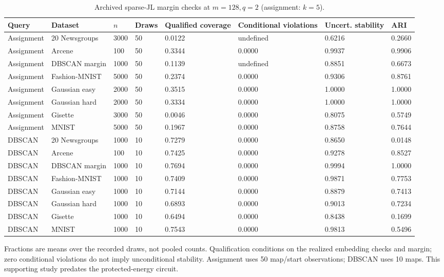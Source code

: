 \begin{table}[!htbp]
\caption{Archived sparse-JL margin checks at $m=128,q=2$ (assignment: $k=5$).}\label{tab:cert-a}
\centering\scriptsize
\begin{adjustbox}{max width=\textwidth}
\begin{tabular}{@{}llllllll@{}}
\toprule
Query & Dataset & $n$ & Draws & Qualified coverage & Conditional violations & Uncert. stability & ARI \\
\midrule
Assignment & 20 Newsgroups & 3000 & 50 & 0.0122 & undefined & 0.6216 & 0.2660 \\
Assignment & Arcene & 100 & 50 & 0.3344 & 0.0000 & 0.9937 & 0.9906 \\
Assignment & DBSCAN margin & 1000 & 50 & 0.1139 & undefined & 0.8851 & 0.6673 \\
Assignment & Fashion-MNIST & 5000 & 50 & 0.2374 & 0.0000 & 0.9306 & 0.8761 \\
Assignment & Gaussian easy & 2000 & 50 & 0.3515 & 0.0000 & 1.0000 & 1.0000 \\
Assignment & Gaussian hard & 2000 & 50 & 0.3334 & 0.0000 & 1.0000 & 1.0000 \\
Assignment & Gisette & 3000 & 50 & 0.0046 & 0.0000 & 0.8075 & 0.5749 \\
Assignment & MNIST & 5000 & 50 & 0.1967 & 0.0000 & 0.8758 & 0.7644 \\
DBSCAN & 20 Newsgroups & 1000 & 10 & 0.7279 & 0.0000 & 0.8650 & 0.0148 \\
DBSCAN & Arcene & 100 & 10 & 0.7425 & 0.0000 & 0.9278 & 0.8527 \\
DBSCAN & DBSCAN margin & 1000 & 10 & 0.7694 & 0.0000 & 0.9994 & 1.0000 \\
DBSCAN & Fashion-MNIST & 1000 & 10 & 0.7409 & 0.0000 & 0.9871 & 0.7753 \\
DBSCAN & Gaussian easy & 1000 & 10 & 0.7144 & 0.0000 & 0.8879 & 0.7413 \\
DBSCAN & Gaussian hard & 1000 & 10 & 0.6893 & 0.0000 & 0.9013 & 0.7234 \\
DBSCAN & Gisette & 1000 & 10 & 0.6494 & 0.0000 & 0.8438 & 0.1699 \\
DBSCAN & MNIST & 1000 & 10 & 0.7543 & 0.0000 & 0.9813 & 0.5496 \\
\bottomrule
\end{tabular}
\end{adjustbox}
\par\smallskip
\begin{minipage}{\textwidth}\scriptsize Fractions are means over the recorded draws, not pooled counts. Qualification conditions on the realized embedding checks and margin; zero conditional violations do not imply unconditional stability. Assignment uses 50 map/start observations; DBSCAN uses 10 maps. This supporting study predates the protected-energy circuit.\end{minipage}
\end{table}
